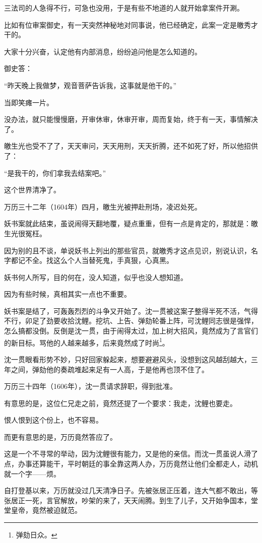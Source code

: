 \begin{multicols}{\theparacolNo}
三法司的人急得不行，可急也没用，于是有些不地道的人就开始拿案件开涮。

比如有位审案御史，有一天突然神秘地对同事说，他已经确定，此案一定是皦秀才干的。

大家十分兴奋，认定他有内部消息，纷纷追问他是怎么知道的。

御史答：

“昨天晚上我做梦，观音菩萨告诉我，这事就是他干的。”

当即笑瘫一片。

没办法，就只能慢慢磨，开审休审，休审开审，周而复始，终于有一天，事情解决了。

皦生光也受不了了，天天审问，天天用刑，天天折腾，还不如死了好，所以他招供了：

“是我干的，你们拿我去结案吧。”

这个世界清净了。

万历三十二年（1604年）四月，皦生光被押赴刑场，凌迟处死。

妖书案就此结束，虽说闹得天翻地覆，疑点重重，但有一点是肯定的，那就是：皦生光很冤枉。

因为别的且不谈，单说妖书上列出的那些官员，就皦秀才这点见识，别说认识，名字都记不全。找这么个人当替死鬼，手真狠，心真黑。

妖书何人所写，目的何在，没人知道，似乎也没人想知道。

因为有些时候，真相其实一点也不重要。

妖书案是结了，可轰轰烈烈的斗争又开始了。沈一贯被这案子整得半死不活，气得不行，卯足了劲要收拾沈鲤。挖坑、上告、弹劾轮番上阵，可沈鲤同志很是强悍，怎么搞都没倒。反倒是沈一贯，由于闹得太过，加上树大招风，竟然成为了言官们的新目标。骂他的人越来越多，后来竟然成了时尚\footnote{弹劾日众。}。

沈一贯眼看形势不妙，只好回家躲起来，想要避避风头，没想到这风越刮越大，三年之间，弹劾他的奏疏堆起来足有一人高，于是他再也顶不住了。

万历三十四年（1606年），沈一贯请求辞职，得到批准。

有意思的是，这位仁兄走之前，竟然还提了一个要求：我走，沈鲤也要走。

恨人恨到这个份上，也不容易。

而更有意思的是，万历竟然答应了。

这是一个不寻常的举动，因为沈鲤很有能力，又是他的亲信。而沈一贯虽说人滑了点，办事还算能干，平时朝廷的事全靠这两人办，万历竟然让他们全都走人，动机就一个字——烦。

自打登基以来，万历就没过几天清净日子。先被张居正压着，连大气都不敢出，等张居正一死，言官解放，吵架的来了，天天闹腾。到生了儿子，又开始争国本，堂堂皇帝，竟然被迫就范。


\end{multicols}
